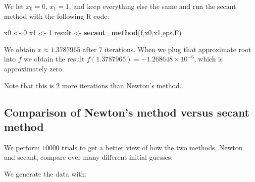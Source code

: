 \documentclass[
]{article}
\newenvironment{Shaded}{\begin{snugshade}}{\end{snugshade}}
\newcommand{\AttributeTok}[1]{\textcolor[rgb]{0.13,0.29,0.53}{#1}}
\newcommand{\ControlFlowTok}[1]{\textcolor[rgb]{0.13,0.29,0.53}{\textbf{#1}}}
\newcommand{\DecValTok}[1]{\textcolor[rgb]{0.00,0.00,0.81}{#1}}
\newcommand{\FunctionTok}[1]{\textcolor[rgb]{0.13,0.29,0.53}{\textbf{#1}}}
\newcommand{\NormalTok}[1]{#1}
\newcommand{\OtherTok}[1]{\textcolor[rgb]{0.56,0.35,0.01}{#1}}
\newcommand{\SpecialCharTok}[1]{\textcolor[rgb]{0.81,0.36,0.00}{\textbf{#1}}}
\begin{document}
We let \(x_0 = 0\), \(x_1 = 1\), and keep everything else the same and
run the secant method with the following R code:

\begin{Shaded}
\begin{Highlighting}[]
\NormalTok{x0 }\OtherTok{\textless{}{-}} \DecValTok{0}
\NormalTok{x1 }\OtherTok{\textless{}{-}} \DecValTok{1}
\NormalTok{result }\OtherTok{\textless{}{-}} \FunctionTok{secant\_method}\NormalTok{(f,x0,x1,eps,F)}
\end{Highlighting}
\end{Shaded}

We obtain \(x \approx 1.3787965\) after \(7\) iterations. When we plug
that approximate root into \(f\) we obtain the result
\(f(1.3787965) = \ensuremath{-1.268648\times 10^{-6}}\), which is
approximately zero.

Note that this is \(2\) more iterations than Newton's method.

\hypertarget{comparison-of-newtons-method-versus-secant-method}{%
\subsection{Comparison of Newton's method versus secant
method}\label{comparison-of-newtons-method-versus-secant-method}}

We perform \(10000\) trials to get a better view of how the two methods,
Newton and secant, compare over many different initial guesses.

We generate the data with:

\begin{Shaded}
\end{Shaded}
\end{document}
